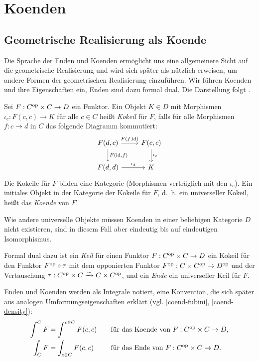 \chapter{Koenden}
\label{ch:coends}

\section{Geometrische Realisierung als Koende}

Die Sprache der Enden und Koenden ermöglicht uns eine allgemeinere
Sicht auf die geometrische Realisierung und wird sich später als
nützlich erweisen, um andere Formen der geometrischen Realisierung
einzuführen. Wir führen Koenden und ihre Eigenschaften ein, Enden sind
dazu formal dual. Die Darstellung folgt \cite{Lore}.
\begin{defn}
  Sei $F: C^\mathrm{op} \times C \to D$ ein Funktor. Ein Objekt $K \in D$ mit
  Morphismen $\iota_c: F(c, c) \to K$ für alle $c \in C$ heißt
  \emph{Kokeil} für $F$, falls für alle Morphismen $f: c \to d$ in $C$
  das folgende Diagramm kommutiert:
  \[ \begin{tikzcd}
    F(d, c) \arrow{r}{F(f, \id)} \arrow{d}{F(\id, f)}
    & F(c, c) \arrow{d}{\iota_c} \\
    F(d, d) \arrow{r}{\iota_d} & K
  \end{tikzcd} \]
  Die Kokeile für $F$ bilden eine Kategorie (Morphismen verträglich
  mit den $\iota_c$). Ein initiales Objekt in der Kategorie der
  Kokeile für $F$, d.~h. ein universeller Kokeil, heißt das
  \emph{Koende} von $F$.
\end{defn}
Wie andere universelle Objekte müssen Koenden in einer beliebigen
Kategorie $D$ nicht existieren, sind in diesem Fall aber eindeutig bis
auf eindeutigen Isomorphismus.

Formal dual dazu ist ein \emph{Keil} für einen Funktor $F: C^\mathrm{op} \times
C \to D$ ein Kokeil für den Funktor $F^\mathrm{op} \circ \tau$ mit dem
opponierten Funktor $F^\mathrm{op}: C \times C^\mathrm{op} \to D^\mathrm{op}$ und der
Vertauschung $\tau: C^\mathrm{op} \times C \xrightarrow[]{\sim} C \times C^\mathrm{op}$, und ein
\emph{Ende} ein universeller Keil für $F$.

Enden und Koenden werden als Integrale notiert, eine Konvention, die
sich später aus analogen Umformungseigenschaften erklärt
(vgl. \ref{coend-fubini}, \ref{coend-density}):
\begin{alignat*}{2}
  \int^C F &= \int^{c \in C} F(c, c)
  \quad &&\text{für das Koende von } F: C^\mathrm{op} \times C \to D, \\
  \int_C F &= \int_{c \in C} F(c, c)
  && \text{für das Ende von } F: C^\mathrm{op} \times C \to D.
\end{alignat*}

